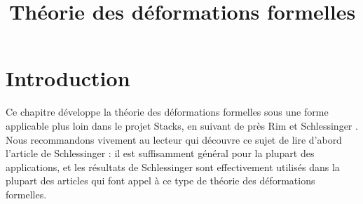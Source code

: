 


%


\title{Théorie des déformations formelles}


\maketitle

\label{section-phantom}

\tableofcontents



\section{Introduction}
\label{section-introduction}

\noindent
Ce chapitre développe la théorie des déformations formelles sous une forme
applicable plus loin dans le projet Stacks, en suivant de près Rim
\cite[Exposee VI]{SGA7-I} et Schlessinger \cite{Sch}. Nous recommandons vivement
au lecteur qui découvre ce sujet de lire d'abord l'article de Schlessinger :
il est suffisamment général pour la plupart des applications, et les résultats
de Schlessinger sont effectivement utilisés dans la plupart des articles
qui font appel à ce type de théorie des déformations formelles.

